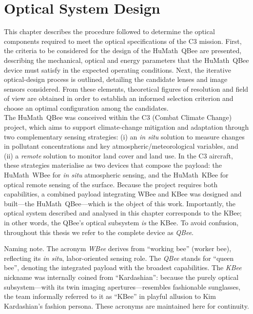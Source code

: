 
\chapter{Optical System Design}
\label{Chapter2}         %

This chapter describes the procedure followed to determine the optical
components required to meet the optical specifications of the C3
mission.  First, the criteria to be considered for the design of the
HuMath\textregistered\ QBee are presented, describing the mechanical,
optical and energy parameters that the HuMath\textregistered\ QBee
device must satisfy in the expected operating conditions.  Next, the
iterative optical-design process is outlined, detailing the candidate
lenses and image sensors considered.  From these elements, theoretical
figures of resolution and field of view are obtained in order to
establish an informed selection criterion and choose an optimal
configuration among the candidates.\\

\noindent The HuMath\textregistered\ QBee was conceived within the C3 (Combat Climate Change) project, which aims to support climate-change mitigation and adaptation through two complementary sensing strategies: (i) an \emph{in situ} solution to measure changes in pollutant concentrations and key atmospheric/meteorological variables, and (ii) a \emph{remote} solution to monitor land cover and land use. In the C3 aircraft, these strategies materialise as two devices that compose the payload: the HuMath\textregistered\ WBee for \emph{in situ} atmospheric sensing, and the HuMath\textregistered\ KBee for optical remote sensing of the surface. Because the project requires both capabilities, a combined payload integrating WBee and KBee was designed and built—the HuMath\textregistered\ QBee—which is the object of this work. Importantly, the optical system described and analysed in this chapter corresponds to the KBee; in other words, the QBee’s optical subsystem \emph{is} the KBee. To avoid confusion, throughout this thesis we refer to the complete device as \textit{QBee}.

\medskip
\noindent Naming note. The acronym \textit{WBee} derives from “working bee” (worker bee), reflecting its \emph{in situ}, labor-oriented sensing role. The \textit{QBee} stands for “queen bee”, denoting the integrated payload with the broadest capabilities. The \textit{KBee} nickname was internally coined from “Kardashian”: because the purely optical subsystem—with its twin imaging apertures—resembles fashionable sunglasses, the team informally referred to it as “KBee” in playful allusion to Kim Kardashian’s fashion persona. These acronyms are maintained here for continuity.

